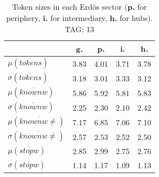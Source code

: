 \begin{table}[h!]
\begin{center}
\begin{tabular}{| l | c | c | c | c |}\hline
 & g. & p. & i. & h. \\\hline
$\mu(\overline{tokens})$ & 3.83  & 4.01  & 3.71  & 3.78 \\\hline
$\sigma(\overline{tokens})$ & 3.18  & 3.01  & 3.33  & 3.12 \\\hline
$\mu(\overline{knownw})$ & 5.86  & 5.92  & 5.81  & 5.83 \\\hline
$\sigma(\overline{knownw})$ & 2.25  & 2.30  & 2.10  & 2.42 \\\hline
$\mu(\overline{knownw \neq})$ & 7.17  & 6.85  & 7.06  & 7.10 \\\hline
$\sigma(\overline{knownw \neq})$ & 2.57  & 2.53  & 2.52  & 2.50 \\\hline
$\mu(\overline{stopw})$ & 2.85  & 2.99  & 2.75  & 2.76 \\\hline
$\sigma(\overline{stopw})$ & 1.14  & 1.17  & 1.09  & 1.13 \\\hline
\end{tabular}
\caption{Token sizes in each Erd\"os sector ({{\bf p.}} for periphery, {{\bf i.}} for intermediary, {{\bf h.}} for hubs). TAG: 13}
\end{center}
\end{table}